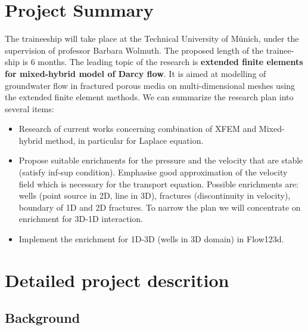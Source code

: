 \documentclass{sna}
\begin{document}
\section{Project Summary}
The traineeship will take place at the Technical University of M{\" u}nich, under the supervision of professor
Barbara Wolmuth. The proposed length of the trainee-ship is 6 months. The leading topic of the research is 
\textbf{extended finite elements for mixed-hybrid model of Darcy flow}. It is aimed at modelling of groundwater 
flow in fractured porous media on multi-dimensional meshes using the extended finite element methods. 
We can summarize the research plan into several items:
\begin{itemize}
  \item Research of current works concerning combination of XFEM and Mixed-hybrid method, in particular for Laplace equation. 
  \item Propose suitable enrichments for the pressure and the velocity that are stable (satisfy inf-sup condition). 
        Emphasise good approximation of the velocity field which is necessary for the transport equation. 
        Possible enrichments are: wells (point source in 2D, line in 3D), fractures (discontinuity in velocity), 
        boundary of 1D and 2D  fractures. To narrow the plan we will concentrate on enrichment for 3D-1D interaction.
  \item Implement the enrichment for 1D-3D (wells in 3D domain) in Flow123d.
\end{itemize}



\section{Detailed project descrition}
\subsection{Background} \label{sec:background}

\cite{exner_2015}
\cite{gracie_modelling_2010}
\cite{craig_using_2011}
\cite{fries_corrected_2008}
\cite{babuska_stable_2012}
\cite{gupta_stable_2013}
\cite{bangerth_deal.ii_2007}
\cite{fries_xfem_overview_2010}
\end{document}
